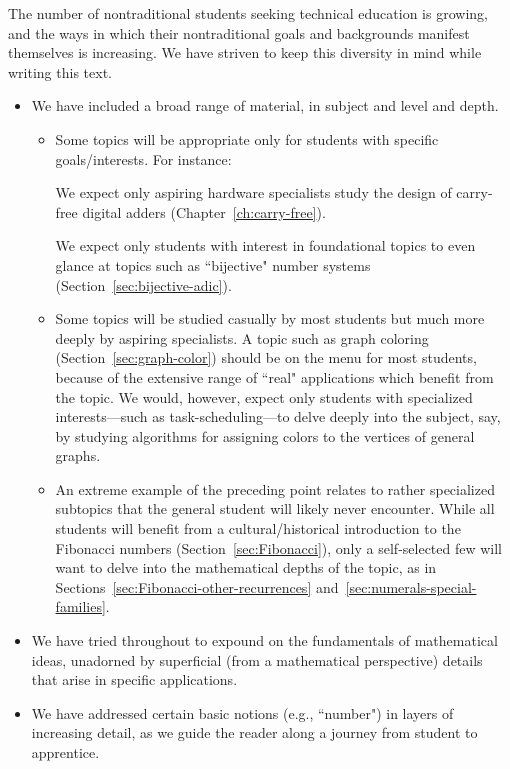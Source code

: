 The number of nontraditional students seeking technical education is growing, and the ways in which their nontraditional goals and backgrounds manifest themselves is increasing.  We have striven to keep this diversity in mind while writing this text.
\begin{itemize}
\item
We have included a broad range of material, in subject and level and depth.
  \begin{itemize}
  \item
Some topics will be appropriate only for students with specific goals/interests.  For instance:

\smallskip

We expect only aspiring hardware specialists study the design of carry-free digital adders (Chapter~\ref{ch:carry-free}).

\smallskip

We expect only students with interest in foundational topics to even glance at topics such as ``bijective" number systems (Section~\ref{sec:bijective-adic}).
  \medskip\item
Some topics will be studied casually by most students but much more deeply by aspiring specialists.  A topic such as graph coloring (Section~\ref{sec:graph-color}) should be on the menu for most students, because of the extensive range of ``real" applications which benefit from the topic.  We would, however, expect only students with specialized interests---such as task-scheduling---to delve deeply into the subject, say, by studying algorithms for assigning colors to the vertices of general graphs.
  \medskip\item
An extreme example of the preceding point relates to rather specialized subtopics that the general student will likely never encounter.  While all students will benefit from a cultural/historical introduction to the Fibonacci numbers (Section~\ref{sec:Fibonacci}), only a self-selected few will want to delve into the mathematical depths of the topic, as in 
Sections~\ref{sec:Fibonacci-other-recurrences} and~\ref{sec:numerals-special-families}.
  \end{itemize}

\medskip\item
We have tried throughout to expound on the fundamentals of mathematical ideas, unadorned by superficial (from a mathematical perspective) details that arise in specific applications.

\medskip\item
We have addressed certain basic notions (e.g., ``number") in layers of increasing detail, as we guide the reader along a journey from student to apprentice.
\end{itemize}

